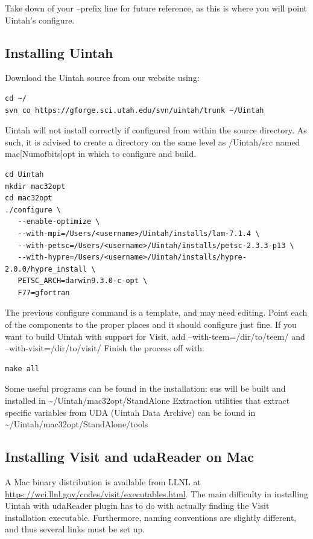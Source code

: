 \documentclass[12pt]{article}
\begin{document}
Take down of your --prefix line for future reference, as this is where you will point Uintah's configure.

\subsection{Installing Uintah}
Download the Uintah source from our website using:

\begin{verbatim}
cd ~/
svn co https://gforge.sci.utah.edu/svn/uintah/trunk ~/Uintah
\end{verbatim}

Uintah will not install correctly if configured from within the source directory.  As such, it is advised to create a directory on the same level as /Uintah/src named mac[Numofbits]opt in which to configure and build.  

\begin{verbatim}
cd Uintah
mkdir mac32opt
cd mac32opt
./configure \
   --enable-optimize \
   --with-mpi=/Users/<username>/Uintah/installs/lam-7.1.4 \
   --with-petsc=/Users/<username>/Uintah/installs/petsc-2.3.3-p13 \
   --with-hypre=/Users/<username>/Uintah/installs/hypre-2.0.0/hypre_install \
   PETSC_ARCH=darwin9.3.0-c-opt \
   F77=gfortran
\end{verbatim}

The previous configure command is a template, and may need editing.  Point each of the components to the proper places and it should configure just fine.  If you want to build Uintah with support for Visit, add --with-teem=/dir/to/teem/ and --with-visit=/dir/to/visit/ Finish the process off with:

\begin{verbatim}
make all
\end{verbatim}
  

Some useful programs can be found in the installation:  
sus will be built and installed in \textasciitilde/Uintah/mac32opt/StandAlone  
Extraction utilities that extract specific variables from UDA (Uintah Data Archive) can be found in \textasciitilde/Uintah/mac32opt/StandAlone/tools

\subsection{Installing Visit and udaReader on Mac}

A Mac binary distribution is available from LLNL at \url{https://wci.llnl.gov/codes/visit/executables.html}.  The main difficulty in installing Uintah with udaReader plugin has to do with actually finding the Visit installation executable.  Furthermore, naming conventions are slightly different, and thus several links must be set up.
\end{document}
